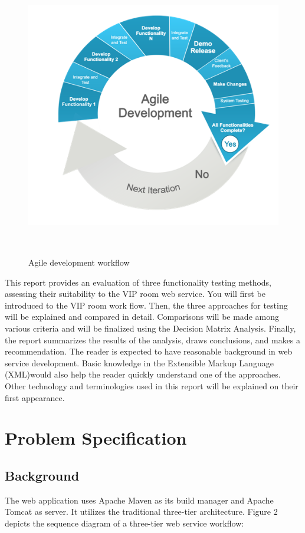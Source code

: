 \documentclass[12pt]{article}
\begin{document}
\begin{figure}[ht!]
\centering
\includegraphics[width=12.5cm,height=12.5cm,keepaspectratio]{img/agile.png}
\caption{Agile development workflow}
\label{overflow}
\end{figure}

This report provides an evaluation of three functionality testing methods, assessing their 
suitability to the VIP room web service. You will first be introduced to the VIP room work flow. Then, the three approaches for testing will be explained and compared in detail. Comparisons will be made among various criteria and will be finalized using the Decision Matrix Analysis. Finally, the report summarizes the results of the analysis, draws 
conclusions, and makes a recommendation. The reader is expected to have reasonable background in web service development. Basic knowledge in the Extensible Markup Language (XML)would also help the reader quickly understand one of the approaches. Other technology and terminologies used in this report will be explained on their first appearance.\\



\newpage

\section{Problem Specification}
\subsection{Background}
The web application uses Apache Maven as its build manager and Apache Tomcat as server. It utilizes the traditional three-tier architecture. Figure 2 depicts the sequence diagram of a three-tier web service workflow:
\end{document}
